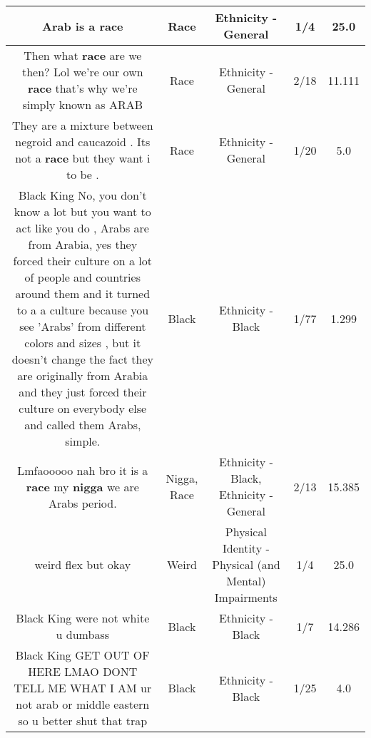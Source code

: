 \documentclass[11pt]{article}
\newlength\mylength
\begin{document}
\begin{center}
\begin{longtable}{|C{.65\mylength}|C{.30\mylength}|C{.12\mylength}|C{.12\mylength}|C{.12\mylength}|}
  \small Arab is a race\normalsize   & Race & Ethnicity - General & 1/4 & 25.0 \\  \hline
  \small Then what \textbf{race} are we then? Lol we're our own \textbf{race} that's why we're simply known as ARAB\normalsize   & Race & Ethnicity - General & 2/18 & 11.111 \\  \hline
  \small They are a mixture between negroid and caucazoid . Its not a \textbf{race} but they want i to be .\normalsize   & Race & Ethnicity - General & 1/20 & 5.0 \\  \hline
  \small Black King No, you don't know a lot but you want to act like you do , Arabs are from Arabia, yes they forced their culture on a lot of people and countries around them and it turned to a a culture because you see 'Arabs' from different colors and sizes , but it doesn't change the fact they are originally from Arabia and they just forced their culture on everybody else and called them Arabs, simple.\normalsize   & Black & Ethnicity - Black & 1/77 & 1.299 \\  \hline
  \small Lmfaooooo nah bro it is a \textbf{race} my \textbf{nigga} we are Arabs period.\normalsize   & Nigga, Race & Ethnicity - Black, Ethnicity - General & 2/13 & 15.385 \\  \hline
  \small weird flex but okay\normalsize   & Weird & Physical Identity - Physical (and Mental) Impairments & 1/4 & 25.0 \\  \hline
  \small Black King were not white u dumbass\normalsize   & Black & Ethnicity - Black & 1/7 & 14.286 \\  \hline
  \small Black King GET OUT OF HERE LMAO DONT TELL ME WHAT I AM ur not arab or middle eastern so u better shut that trap\normalsize   & Black & Ethnicity - Black & 1/25 & 4.0 \\  \hline

\end{longtable}
\end{center}
\end{document}

